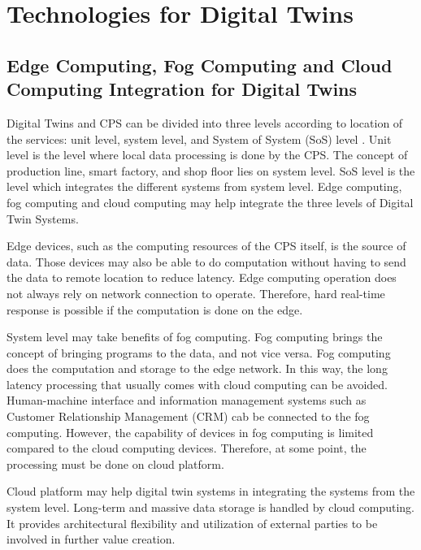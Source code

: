 \documentclass[article]{aaltoseries}
\begin{document}





\section{Technologies for Digital Twins}
\subsection{Edge Computing, Fog Computing and Cloud Computing Integration for Digital Twins}
Digital Twins and CPS can be divided into three levels according to location of the services: unit level, system level, and System of System (SoS) level \cite{qi2018modeling}. Unit level is the level where local data processing is done by the CPS. The concept of production line, smart factory, and shop floor lies on system level. SoS level is the level which integrates the different systems from system level. Edge computing, fog computing and cloud computing may help integrate the three levels of Digital Twin Systems.

Edge devices, such as the computing resources of the CPS itself, is the source of data. Those devices may also be able to do computation without having to send the data to remote location to reduce latency. Edge computing operation does not always rely on network connection to operate. Therefore, hard real-time response is possible if the computation is done on the edge.

System level may take benefits of fog computing. Fog computing brings the concept of bringing programs to the data, and not vice versa. Fog computing does the computation and storage to the edge network. In this way, the long latency processing that usually comes with cloud computing can be avoided. Human-machine interface and information management systems such as Customer Relationship Management (CRM) cab be connected to the fog computing. However, the capability of devices in fog computing is limited compared to the cloud computing devices. Therefore, at some point, the processing must be done on cloud platform. 

Cloud platform may help digital twin systems in integrating the systems from the system level. Long-term and massive data storage is handled by cloud computing. It provides architectural flexibility and utilization of external parties to be involved in further value creation.
\end{document}
